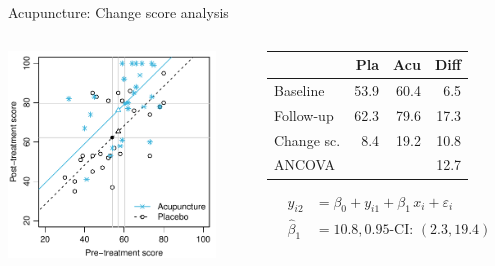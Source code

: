 \documentclass[aspectratio=169]{beamer}
\begin{document}
\begin{frame}{Acupuncture: Change score analysis}
\begin{columns}[T]
\begin{column}{5.5cm}
  \includegraphics[width=5.5cm]{../figures/acu-chng}
\end{column}
%
\begin{column}{5.5cm}
  \vspace*{1em}\small
  \begin{tabular}{lrrr}
  \hline
             &  Pla &  Acu & Diff \\ \hline
  Baseline   & 53.9 & 60.4 &  6.5 \\
  Follow-up  & 62.3 & 79.6 & 17.3 \\
  Change sc. &  8.4 & 19.2 & 10.8 \\
  ANCOVA     &      &      & 12.7 \\ \hline
  \end{tabular}
\begin{align*}
         y_{i2} &= \beta_0 + y_{i1} + \beta_1 \, x_i + \varepsilon_i \\
  \hat{\beta}_1 &= 10.8, 0.95\text{-CI: } (2.3, 19.4)
\end{align*}
\end{column}
\end{columns}
\end{frame}
\end{document}
